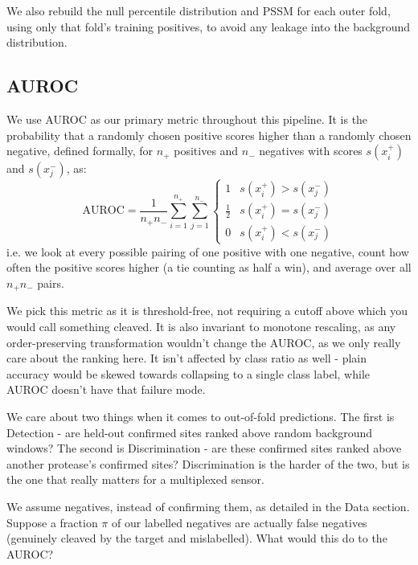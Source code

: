 \documentclass[10pt,a4paper]{article}
\numberwithin{equation}{section}
\begin{document}
We also rebuild the null percentile distribution and PSSM for each outer fold, using only that fold's training positives, to avoid any leakage into the background distribution.

\subsection{AUROC}

We use AUROC as our primary metric throughout this pipeline. It is the probability that a randomly chosen positive scores higher than a randomly chosen negative, defined formally, for $n_+$ positives and $n_-$ negatives with scores $s(x_i^+)$ and $s(x_j^-)$, as:
\begin{equation}
\mathrm{AUROC} = \frac{1}{n_+ n_-} \sum_{i=1}^{n_+}\sum_{j=1}^{n_-}
\begin{cases}
1 & s(x_i^+) > s(x_j^-) \\
\tfrac12 & s(x_i^+) = s(x_j^-) \\
0 & s(x_i^+) < s(x_j^-)
\end{cases}
\label{eq:auroc}
\end{equation}
i.e. we look at every possible pairing of one positive with one negative, count how often the positive scores higher (a tie counting as half a win), and average over all $n_+n_-$ pairs.

We pick this metric as it is threshold-free, not requiring a cutoff above which you would call something cleaved. It is also invariant to monotone rescaling, as any order-preserving transformation wouldn't change the AUROC, as we only really care about the ranking here. It isn't affected by class ratio as well - plain accuracy would be skewed towards collapsing to a single class label, while AUROC doesn't have that failure mode.

We care about two things when it comes to out-of-fold predictions. The first is Detection - are held-out confirmed sites ranked above random background windows? The second is Discrimination - are these confirmed sites ranked above another protease's confirmed sites? Discrimination is the harder of the two, but is the one that really matters for a multiplexed sensor.

We assume negatives, instead of confirming them, as detailed in the Data section. Suppose a fraction $\pi$ of our labelled negatives are actually false negatives (genuinely cleaved by the target and mislabelled). What would this do to the AUROC?
\end{document}
